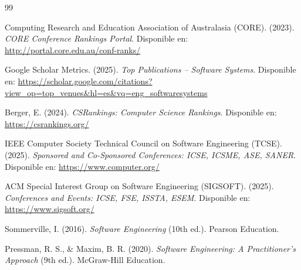 \documentclass[12pt,a4paper]{article}
\begin{document}
\newpage
\begin{thebibliography}{99}

Computing Research and Education Association of Australasia (CORE). (2023). 
\textit{CORE Conference Rankings Portal}. 
Disponible en: \url{http://portal.core.edu.au/conf-ranks/}

Google Scholar Metrics. (2025). 
\textit{Top Publications -- Software Systems}. 
Disponible en: \url{https://scholar.google.com/citations?view_op=top_venues&hl=es&vq=eng_softwaresystems}

Berger, E. (2024). 
\textit{CSRankings: Computer Science Rankings}. 
Disponible en: \url{https://csrankings.org/}

IEEE Computer Society Technical Council on Software Engineering (TCSE). (2025). 
\textit{Sponsored and Co-Sponsored Conferences: ICSE, ICSME, ASE, SANER}. 
Disponible en: \url{https://www.computer.org/}

ACM Special Interest Group on Software Engineering (SIGSOFT). (2025). 
\textit{Conferences and Events: ICSE, FSE, ISSTA, ESEM}. 
Disponible en: \url{https://www.sigsoft.org/}

Sommerville, I. (2016). 
\textit{Software Engineering} (10th ed.). Pearson Education.

Pressman, R. S., \& Maxim, B. R. (2020). 
\textit{Software Engineering: A Practitioner's Approach} (9th ed.). McGraw-Hill Education.

\end{thebibliography}
\end{document}
